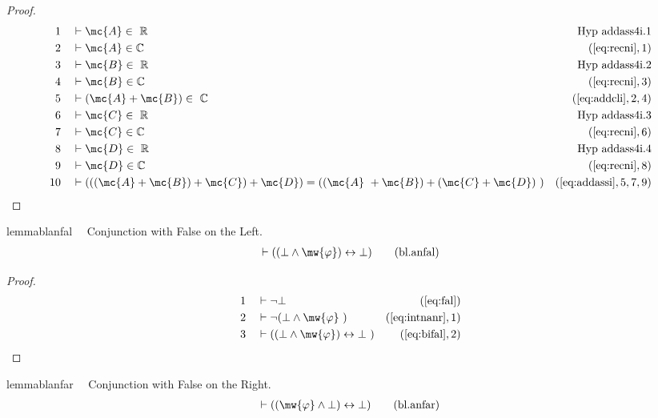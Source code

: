 \begin{proof}
\begin{align}
  1 &&  & \vdash \mc{A} \in
     ~\mathbb{R}&\text{Hyp~addass4i.1}\notag%
  \\ 2 &&  & \vdash \mc{A} \in \mathbb{C}&(\mbox{\ref{eq:recni}},1)\notag
  \\ 3 &&  & \vdash \mc{B} \in
     ~\mathbb{R}&\text{Hyp~addass4i.2}\notag%
  \\ 4 &&  & \vdash \mc{B} \in \mathbb{C}&(\mbox{\ref{eq:recni}},3)\notag
  \\ 5 &&  & \vdash ( \mc{A} + \mc{B} ) \in
     ~\mathbb{C}&(\mbox{\ref{eq:addcli}},2,4)\notag
  \\ 6 &&  & \vdash \mc{C} \in
     ~\mathbb{R}&\text{Hyp~addass4i.3}\notag%
  \\ 7 &&  & \vdash \mc{C} \in \mathbb{C}&(\mbox{\ref{eq:recni}},6)\notag
  \\ 8 &&  & \vdash \mc{D} \in
     ~\mathbb{R}&\text{Hyp~addass4i.4}\notag%
  \\ 9 &&  & \vdash \mc{D} \in \mathbb{C}&(\mbox{\ref{eq:recni}},8)\notag
  \\ 10 &&  & \vdash ( ( ( \mc{A} + \mc{B} ) + \mc{C} ) + \mc{D} ) = ( ( \mc{A}
     ~+ \mc{B} ) + ( \mc{C} + \mc{D} )
     ~)&(\mbox{\ref{eq:addassi}},5,7,9)\notag
\end{align}
\end{proof}

\begin{restatable}{lemma}{blanfal}~~ Conjunction with False on the Left.
\begin{align}
\vdash ( ( \bot \wedge \mw{\varphi} ) \leftrightarrow \bot
    )\label{eq:bl.anfal}\tag{bl.anfal}
\end{align}
\end{restatable}

\begin{proof}
\begin{align}
  1 &&  & \vdash \lnot \bot&(\mbox{\ref{eq:fal}})\notag
  \\ 2 &&  & \vdash \lnot ( \bot \wedge \mw{\varphi}
     ~)&(\mbox{\ref{eq:intnanr}},1)\notag
  \\ 3 &&  & \vdash ( ( \bot \wedge \mw{\varphi} ) \leftrightarrow \bot
     ~)&(\mbox{\ref{eq:bifal}},2)\notag
\end{align}
\end{proof}

\begin{restatable}{lemma}{blanfar}~~ Conjunction with False on the Right.
\begin{align}
\vdash ( ( \mw{\varphi} \wedge \bot ) \leftrightarrow \bot
    )\label{eq:bl.anfar}\tag{bl.anfar}
\end{align}
\end{restatable}


